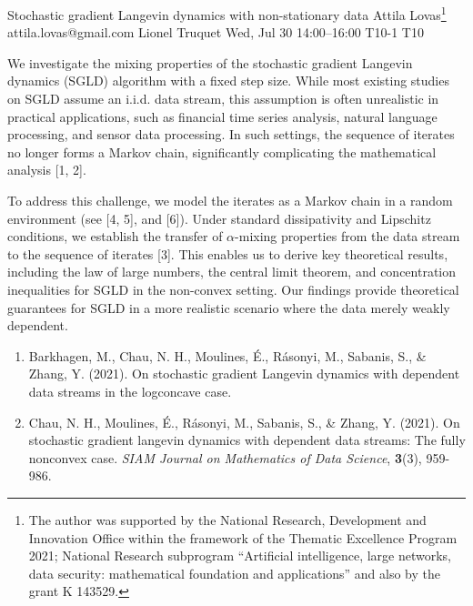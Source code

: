 \begin{talk}
  {Stochastic gradient Langevin dynamics with non-stationary data}%
  {Attila Lovas\footnote{The author was supported by the National Research, Development and Innovation Office within the framework of the Thematic Excellence Program 2021; National Research subprogram “Artificial intelligence, large networks, data security: mathematical foundation and applications” and also by the grant K 143529.}}%
  {attila.lovas@gmail.com}%
  {Lionel Truquet}%
  {}%
  {}%
  {Wed, Jul 30 14:00–16:00}%
  {T10-1}%
  {T10}%
  
				
		
We investigate the mixing properties of the stochastic gradient Langevin dynamics (SGLD) algorithm with a fixed step size. While most existing studies on SGLD assume an i.i.d. data stream, this assumption is often unrealistic in practical applications, such as financial time series analysis, natural language processing, and sensor data processing. In such settings, the sequence of iterates no longer forms a Markov chain, significantly complicating the mathematical analysis [1, 2].

To address this challenge, we model the iterates as a Markov chain in a random environment (see [4, 5], and [6]). Under standard dissipativity and Lipschitz conditions, we establish the transfer of $\alpha$-mixing properties from the data stream to the sequence of iterates [3]. This enables us to derive key theoretical results, including the law of large numbers, the central limit theorem, and concentration inequalities for SGLD in the non-convex setting. Our findings provide theoretical guarantees for SGLD in a more realistic scenario where the data merely weakly dependent.
		
\medskip

\begin{enumerate}
	
	\item[{[1]}] Barkhagen, M., Chau, N. H., Moulines, \'E., R\'asonyi, M., Sabanis, S., \& Zhang, Y. (2021). On stochastic gradient Langevin dynamics with dependent data streams in the logconcave case.
	
	\item[{[2]}] Chau, N. H., Moulines, \'E., R\'asonyi, M., Sabanis, S., \& Zhang, Y. (2021). On stochastic gradient langevin dynamics with dependent data streams: The fully nonconvex case. {\it SIAM Journal on Mathematics of Data Science}, \textbf{3}(3), 959-986.
	

\end{enumerate}
\end{talk}
